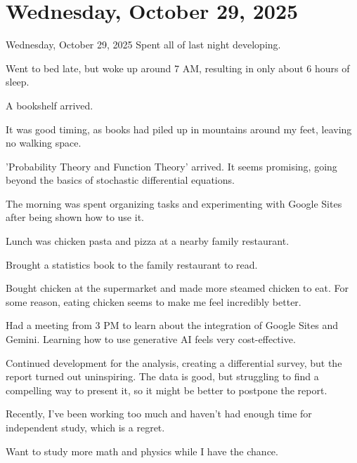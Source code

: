 \documentclass[dvipdfmx, autodetect-engine, aspectratio=169, 10.5pt]{beamer}
\begin{document}
\section{Wednesday, October 29, 2025}
\begin{frame}{Wednesday, October 29, 2025}
	\scriptsize
	Spent all of last night developing.

	Went to bed late, but woke up around 7 AM, resulting in only about 6 hours of sleep.

	A bookshelf arrived.

	It was good timing, as books had piled up in mountains around my feet, leaving no walking space.

	'Probability Theory and Function Theory' arrived.
	It seems promising, going beyond the basics of stochastic differential equations.

	The morning was spent organizing tasks and experimenting with Google Sites after being shown how to use it.

	Lunch was chicken pasta and pizza at a nearby family restaurant.

	Brought a statistics book to the family restaurant to read.

	Bought chicken at the supermarket and made more steamed chicken to eat.
	For some reason, eating chicken seems to make me feel incredibly better.

	Had a meeting from 3 PM to learn about the integration of Google Sites and Gemini.
	Learning how to use generative AI feels very cost-effective.

	Continued development for the analysis, creating a differential survey, but the report turned out uninspiring.
	The data is good, but struggling to find a compelling way to present it, so it might be better to postpone the report.

	Recently, I've been working too much and haven't had enough time for independent study, which is a regret.

	Want to study more math and physics while I have the chance.
\end{frame}
\end{document}
